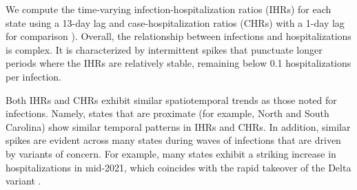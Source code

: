 We compute the time-varying infection-hospitalization ratios (IHRs) for each
state using a 13-day lag and case-hospitalization ratios (CHRs) with a 1-day lag
for comparison ). Overall, the relationship between
infections and hospitalizations is complex. It is characterized by intermittent
spikes that punctuate longer periods where the IHRs are relatively stable,
remaining below 0.1 hospitalizations per infection. 

Both IHRs and CHRs exhibit similar spatiotemporal trends as those noted
for infections. Namely, states that are proximate (for example, North and South
Carolina) show similar temporal patterns in IHRs and CHRs. In addition, similar
spikes are evident across many states during waves of infections that are driven
by variants of concern. For example, many states exhibit a striking increase in
hospitalizations in mid-2021, which coincides with the rapid takeover of the
Delta variant \citep{hodcroft2021covariants}. 





